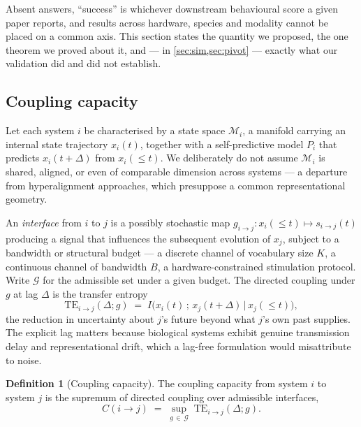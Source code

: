\documentclass[11pt,a4paper]{article}
\theoremstyle{plain}
\theoremstyle{definition}
\newtheorem{definition}[definition]{Definition}
\theoremstyle{remark}
\newcommand{\TE}{\mathrm{TE}}
\begin{document}
Absent answers, ``success'' is whichever downstream behavioural score a given paper reports,
and results across hardware, species and modality cannot be placed on a common axis. This
section states the quantity we proposed, the one theorem we proved about it, and --- in
\cref{sec:sim,sec:pivot} --- exactly what our validation did and did not establish.

\subsection{Coupling capacity}\label{sec:cc}

Let each system $i$ be characterised by a state space $\mathcal{M}_i$, a manifold carrying an
internal state trajectory $x_i(t)$, together with a self-predictive model $P_i$ that predicts
$x_i(t+\Delta)$ from $x_i(\le t)$. We deliberately do not assume $\mathcal{M}_i$ is shared,
aligned, or even of comparable dimension across systems --- a departure from hyperalignment
approaches, which presuppose a common representational geometry.

An \emph{interface} from $i$ to $j$ is a possibly stochastic map
$g_{i\to j}: x_i(\le t) \mapsto s_{i\to j}(t)$ producing a signal that influences the
subsequent evolution of $x_j$, subject to a bandwidth or structural budget --- a discrete
channel of vocabulary size $K$, a continuous channel of bandwidth $B$, a hardware-constrained
stimulation protocol. Write $\mathcal{G}$ for the admissible set under a given budget. The
directed coupling under $g$ at lag $\Delta$ is the transfer entropy
\citep{schreiber2000measuring, massey1990causality}
\begin{equation}\label{eq:te}
\TE_{i \to j}(\Delta; g) \;=\; I\big(x_i(t)\, ;\, x_j(t+\Delta) \,\big|\, x_j(\le t)\big),
\end{equation}
the reduction in uncertainty about $j$'s future beyond what $j$'s own past supplies. The
explicit lag matters because biological systems exhibit genuine transmission delay and
representational drift, which a lag-free formulation would misattribute to noise.

\begin{definition}[Coupling capacity]\label{def:cc}
The coupling capacity from system $i$ to system $j$ is the supremum of directed coupling over
admissible interfaces,
\begin{equation}
C(i \to j) \;=\; \sup_{g \,\in\, \mathcal{G}} \; \TE_{i \to j}(\Delta; g).
\end{equation}
\end{definition}
\end{document}
